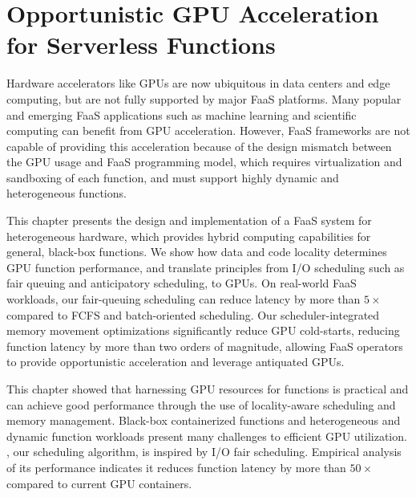 \chapter{Opportunistic GPU Acceleration for Serverless Functions}
\label{chap:gpu-sched}




%  
Hardware accelerators like GPUs are now ubiquitous in data centers and edge computing, but are not fully supported by major FaaS platforms.
Many popular and emerging FaaS applications such as machine learning and scientific computing can benefit from GPU acceleration.
However, FaaS frameworks are not capable of providing this acceleration because of the design mismatch between the GPU usage and FaaS programming model, which requires virtualization and sandboxing of each function, and must support highly dynamic and heterogeneous functions. 

This chapter presents the design and implementation of a FaaS system for heterogeneous hardware, which provides hybrid computing capabilities for general, black-box functions.
We show how data and code locality determines GPU function performance, and translate principles from I/O scheduling such as fair queuing and anticipatory scheduling, to GPUs. 
On real-world FaaS workloads, our fair-queuing scheduling can reduce latency by more than $5\times$ compared to FCFS and batch-oriented scheduling. 
Our scheduler-integrated memory movement optimizations significantly reduce GPU cold-starts, reducing function latency by more than two orders of magnitude, allowing FaaS operators to provide opportunistic acceleration and leverage antiquated GPUs. 










%



This chapter showed that harnessing GPU resources for functions is practical and can achieve good performance through the use of locality-aware scheduling and memory management.
Black-box containerized functions and heterogeneous and dynamic function workloads present many challenges to efficient GPU utilization. 
\QName, our scheduling algorithm, is inspired by I/O fair scheduling. Empirical analysis of its performance indicates it reduces function latency by more than $50\times$ compared to current GPU containers. 

% 
